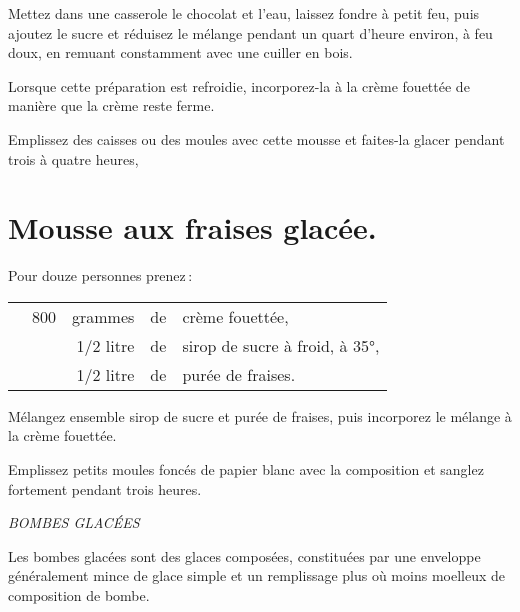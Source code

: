 Mettez dans une casserole le chocolat et l'eau, laissez fondre à petit feu, puis
ajoutez le sucre et réduisez le mélange pendant un quart d'heure environ, à feu
doux, en remuant constamment avec une cuiller en bois.

Lorsque cette préparation est refroidie, incorporez-la à la crème fouettée de
manière que la crème reste ferme.

Emplissez des caisses ou des moules avec cette mousse et faites-la glacer
pendant trois à quatre heures,

\section*{\centering Mousse aux fraises glacée.}
{}

Pour douze personnes prenez :

\footnotesize
\begin{longtable}{rrrrp{16em}}
  & 800 & grammes & de & crème fouettée,                                                                  \\
  & \multicolumn{2}{r}{1/2 litre} & de & sirop de sucre à froid, à 35°,                                   \\
  & \multicolumn{2}{r}{1/2 litre} & de & purée de fraises.                                                \\
\end{longtable}
\normalsize

Mélangez ensemble sirop de sucre et purée de fraises, puis incorporez le
mélange à la crème fouettée.

Emplissez {\mmm} petits moules foncés de papier blanc avec la composition
et sanglez fortement pendant trois heures.

\bigskip

\begin{center}
\textit{BOMBES GLACÉES}
\end{center}

\bigskip

Les bombes glacées sont des glaces composées, constituées par une enveloppe
généralement mince de glace simple et un remplissage plus où moins moelleux de
composition de bombe.

